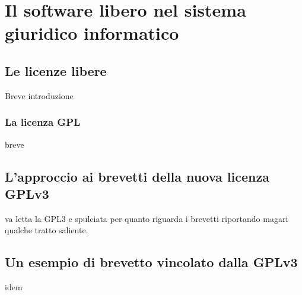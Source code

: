  \chapter{Il software libero nel sistema giuridico informatico}

\section{Le licenze libere}
Breve introduzione
	\subsection{La licenza GPL}
	breve
\section{L'approccio ai brevetti della nuova licenza GPLv3}
va letta la GPL3 e spulciata per quanto riguarda i brevetti riportando magari qualche tratto saliente.
\section{Un esempio di brevetto vincolato dalla GPLv3}
idem


